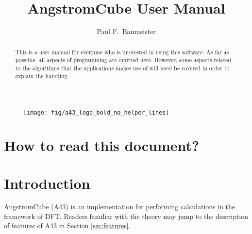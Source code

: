 \documentclass[oribibl]{llncs}
\newcommand{\fullcodename}{AngstromCube}
\newcommand{\codename}{A43}
\begin{document}
\pagestyle{plain}

\title       {\fullcodename{} User Manual}
\titlerunning{\codename{} User Manual}

\author{%
  Paul F.~Baumeister %
}


\maketitle

\begin{figure}
	\centering
	\texttt{[image: fig/a43\_logo\_bold\_no\_helper\_lines]} %
\end{figure}

\begin{abstract}
This is a user manual for everyone who is interested in using
this software.
As far as possible, all aspects of programming are omitted here.
However, some aspects related to the algorithms that the applications 
makes use of will need be covered in order to explain the handling.
\end{abstract}

\newpage

\tableofcontents

\section*{How to read this document?}



\newpage

\section{Introduction} \label{sec:intro}
%
\fullcodename{} (\codename{}) is an implementation for performing calculations 
in the framework of \ac{DFT}.
Readers familiar with the theory may jump to the description of 
features of \codename{} in Section \ref{sec:features}.
\end{document}
